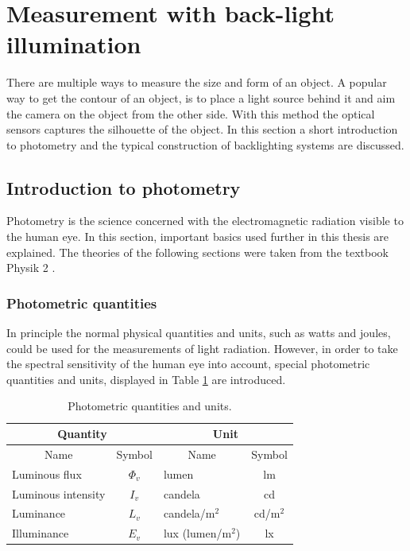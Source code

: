 \newpage
\section{Measurement with back-light illumination}
There are multiple ways to measure the size and form of an object. A popular way to get the contour of an object, is to place a light source behind it and aim the camera on the object from the other side. With this method the optical sensors captures the silhouette of the object. In this section a short introduction to photometry and the typical construction of backlighting systems are discussed.
\subsection{Introduction to photometry}
Photometry is the science concerned with the electromagnetic radiation visible to the human eye. In this section, important basics used further in this thesis are explained. The theories of the following sections were taken from the textbook Physik 2 \cite{ruh}.
\subsubsection{Photometric quantities}
In principle the normal physical quantities and units, such as watts and joules, could be used for the measurements of light radiation. However, in order to take the spectral sensitivity of the human eye into account, special photometric quantities and units, displayed in Table \ref{theory:photo} are introduced.\\

\begin{table}[ht]
\centering
\begin{tabular}{ |p{6cm} p{2cm}|p{6cm} p{2cm}|  }
	\hline
	\multicolumn{2}{|c}{Quantity}&\multicolumn{2}{|c|}{Unit} \\
	\hline\hline
	\multicolumn{1}{|c}{Name}			& \multicolumn{1}{|c|}{Symbol}	& \multicolumn{1}{c}{Name}	& \multicolumn{1}{|c|}{Symbol}	\\

	\hline
	Luminous flux		& \multicolumn{1}{|c|}{$\Phi_v$}	& lumen		& \multicolumn{1}{|c|}{lm}\\
	Luminous intensity 	& \multicolumn{1}{|c|}{$I_v$} 		& candela	& \multicolumn{1}{|c|}{cd}\\
	Luminance			& \multicolumn{1}{|c|}{$L_v$}		& candela/$\text{m}^2$	& \multicolumn{1}{|c|}{cd/$\text{m}^2$}\\
	Illuminance 		& \multicolumn{1}{|c|}{$E_v$} 		& lux (lumen/$\text{m}^2$) 	& \multicolumn{1}{|c|}{lx}\\

	\hline
\end{tabular}
\caption{Photometric quantities and units. \label{theory:photo}}
\end{table}

